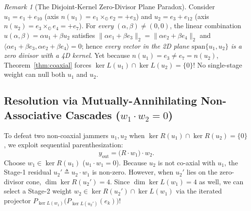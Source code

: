 \documentclass[journal,twoside]{IEEEtran}
\theoremstyle{definition}
\theoremstyle{remark}
\newtheorem{remark}[theorem]{Remark}
\newcommand{\Oc}{\mathbb{O}}
\begin{document}
\begin{remark}[The Disjoint-Kernel Zero-Divisor Plane Paradox]
Consider $u_1 = e_1 + e_{10}$ (axis $n(u_1) = e_1 \times_{\Oc} e_2 = +e_3$) and $u_2 = e_3 + e_{12}$ (axis $n(u_2) = e_3 \times_{\Oc} e_4 = +e_7$). For \emph{every} $(\alpha, \beta) \neq (0, 0)$, the linear combination $u(\alpha, \beta) = \alpha u_1 + \beta u_2$ satisfies $\|\alpha e_1 + \beta e_3\|_2 = \|\alpha e_2 + \beta e_4\|_2$ and $\langle \alpha e_1 + \beta e_3, \alpha e_2 + \beta e_4\rangle = 0$; hence \emph{every vector in the 2D plane $\mathrm{span}\{u_1, u_2\}$ is a zero divisor with a 4D kernel}. Yet because $n(u_1) = e_3 \neq e_7 = n(u_2)$, Theorem~\ref{thm:coaxial} forces $\ker L(u_1) \cap \ker L(u_2) = \{0\}$! No single-stage weight can null both $u_1$ and $u_2$.
\end{remark}

\subsection{Resolution via Mutually-Annihilating Non-Associative Cascades ($w_1 \cdot w_2 = 0$)}
To defeat two non-coaxial jammers $u_1, u_2$ when $\ker R(u_1) \cap \ker R(u_2) = \{0\}$, we exploit sequential parenthesization:
\begin{equation}
    y_{\mathrm{out}} = \bigl(R \cdot w_1\bigr) \cdot w_2.
\end{equation}
Choose $w_1 \in \ker R(u_1)$ ($u_1 \cdot w_1 = 0$). Because $u_2$ is not co-axial with $u_1$, the Stage-1 residual $u_2' \triangleq u_2 \cdot w_1$ is non-zero. However, when $u_2'$ lies on the zero-divisor cone, $\dim\ker R(u_2') = 4$. Since $\dim\ker L(w_1) = 4$ as well, we can select a Stage-2 weight $w_2 \in \ker R(u_2') \cap \ker L(w_1)$ via the iterated projector $P_{\ker L(w_1)}\bigl(P_{\ker L(u_2')}(e_k)\bigr)$!
\end{document}
